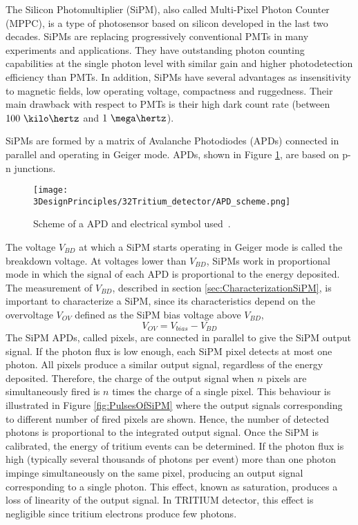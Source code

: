 The Silicon Photomultiplier (SiPM), also called Multi-Pixel Photon Counter (MPPC), is a type of photosensor based on silicon developed in the last two decades. SiPMs are replacing progressively conventional PMTs in many experiments and applications. They have outstanding photon counting capabilities at the single photon level with similar gain and higher photodetection efficiency than PMTs. In addition, SiPMs have several advantages as insensitivity to magnetic fields, low operating voltage, compactness and ruggedness. Their main drawback with respect to PMTs is their high dark count rate (between $100~\kilo\hertz$ and $1~\mega\hertz$).

SiPMs are formed by a matrix of Avalanche Photodiodes (APDs) connected in parallel and operating in Geiger mode. APDs, shown in Figure \ref{fig:SchemeAPD}, are based on p-n junctions.
\begin{figure}[htbp]
\centering
\texttt{[image: 3DesignPrinciples/32Tritium\_detector/APD\_scheme.png]}
\caption{Scheme of a APD and electrical symbol used\label{fig:SchemeAPD}~\cite{OSI}.}
\end{figure}
The voltage $V_ {BD}$ at which a SiPM starts operating in Geiger mode is called the breakdown voltage. At voltages lower than $V_ {BD}$, SiPMs work in proportional mode in which the signal of each APD is proportional to the energy deposited. The measurement of $V_ {BD}$, described in section \ref{sec:CharacterizationSiPM}, is important to characterize a SiPM, since its characteristics depend on the overvoltage $V_{OV}$ defined as the SiPM bias voltage above $V_ {BD}$,
\begin{equation}
V_{OV}=V_{bias}-V_{BD}
\label{overvoltage}
\end{equation}
The SiPM APDs, called pixels, are connected in parallel to give the SiPM output signal. If the photon flux is low enough, each SiPM pixel detects at most one photon. All pixels produce a similar output signal, regardless of the energy deposited. Therefore, the charge of the output signal when $n$ pixels are simultaneously fired is $n$ times the charge of a single pixel. This behaviour is illustrated in Figure \ref{fig:PulsesOfSiPM} where the output signals corresponding to different number of fired pixels are shown. Hence, the number of detected photons is proportional to the integrated output signal. Once the SiPM is calibrated, the energy of tritium events can be determined. If the photon flux is high (typically several thousands of photons per event) more than one photon impinge simultaneously on the same pixel, producing an output signal corresponding to a single photon. This effect, known as saturation, produces a loss of linearity of the output signal. In TRITIUM detector, this effect is negligible since tritium electrons produce few photons. %

